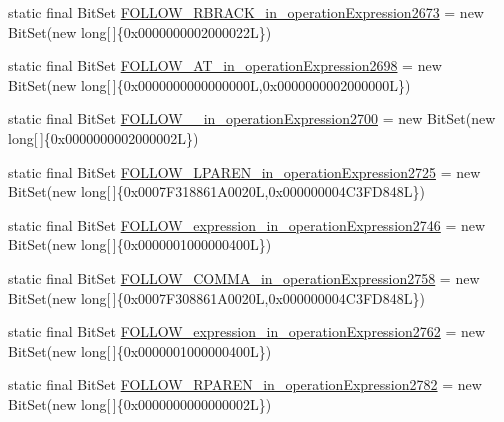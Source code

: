 \begin{DoxyCompactItemize}
\item 
static final Bit\-Set \hyperlink{classorg_1_1tzi_1_1use_1_1parser_1_1shell_1_1_shell_command_parser_a69abab0ebcbc88c8e0aed950aedd78fc}{F\-O\-L\-L\-O\-W\-\_\-\-R\-B\-R\-A\-C\-K\-\_\-in\-\_\-operation\-Expression2673} = new Bit\-Set(new long\mbox{[}$\,$\mbox{]}\{0x0000000002000022\-L\})
\item 
static final Bit\-Set \hyperlink{classorg_1_1tzi_1_1use_1_1parser_1_1shell_1_1_shell_command_parser_aa1f203c241d91b96cb5ddddfef50f821}{F\-O\-L\-L\-O\-W\-\_\-\-A\-T\-\_\-in\-\_\-operation\-Expression2698} = new Bit\-Set(new long\mbox{[}$\,$\mbox{]}\{0x0000000000000000\-L,0x0000000002000000\-L\})
\item 
static final Bit\-Set \hyperlink{classorg_1_1tzi_1_1use_1_1parser_1_1shell_1_1_shell_command_parser_a10e5b7ec433ba1dcec86aaad53883d32}{F\-O\-L\-L\-O\-W\-\_\-\_\-in\-\_\-operation\-Expression2700} = new Bit\-Set(new long\mbox{[}$\,$\mbox{]}\{0x0000000002000002\-L\})
\item 
static final Bit\-Set \hyperlink{classorg_1_1tzi_1_1use_1_1parser_1_1shell_1_1_shell_command_parser_a76682c2f71be4a9286c6a36000953d9e}{F\-O\-L\-L\-O\-W\-\_\-\-L\-P\-A\-R\-E\-N\-\_\-in\-\_\-operation\-Expression2725} = new Bit\-Set(new long\mbox{[}$\,$\mbox{]}\{0x0007\-F318861\-A0020\-L,0x000000004\-C3\-F\-D848\-L\})
\item 
static final Bit\-Set \hyperlink{classorg_1_1tzi_1_1use_1_1parser_1_1shell_1_1_shell_command_parser_ade9ac7e341e63d67551ff60298d204bc}{F\-O\-L\-L\-O\-W\-\_\-expression\-\_\-in\-\_\-operation\-Expression2746} = new Bit\-Set(new long\mbox{[}$\,$\mbox{]}\{0x0000001000000400\-L\})
\item 
static final Bit\-Set \hyperlink{classorg_1_1tzi_1_1use_1_1parser_1_1shell_1_1_shell_command_parser_a4c29458851e82c32d9c489eee0258dfb}{F\-O\-L\-L\-O\-W\-\_\-\-C\-O\-M\-M\-A\-\_\-in\-\_\-operation\-Expression2758} = new Bit\-Set(new long\mbox{[}$\,$\mbox{]}\{0x0007\-F308861\-A0020\-L,0x000000004\-C3\-F\-D848\-L\})
\item 
static final Bit\-Set \hyperlink{classorg_1_1tzi_1_1use_1_1parser_1_1shell_1_1_shell_command_parser_a3e0e812c5e724279e7249599b2e21881}{F\-O\-L\-L\-O\-W\-\_\-expression\-\_\-in\-\_\-operation\-Expression2762} = new Bit\-Set(new long\mbox{[}$\,$\mbox{]}\{0x0000001000000400\-L\})
\item 
static final Bit\-Set \hyperlink{classorg_1_1tzi_1_1use_1_1parser_1_1shell_1_1_shell_command_parser_abad878c4413cb29b8e0ae0d5692f0019}{F\-O\-L\-L\-O\-W\-\_\-\-R\-P\-A\-R\-E\-N\-\_\-in\-\_\-operation\-Expression2782} = new Bit\-Set(new long\mbox{[}$\,$\mbox{]}\{0x0000000000000002\-L\})

\end{DoxyCompactItemize}
